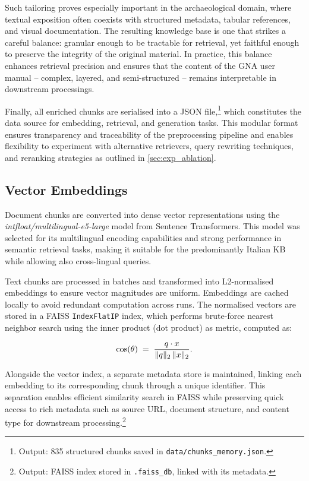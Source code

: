\begin{spacing}{1.5}
Such tailoring proves especially important in the archaeological domain, where textual exposition often coexists with structured metadata, tabular references, and visual documentation. The resulting knowledge base is one that strikes a careful balance: granular enough to be tractable for retrieval, yet faithful enough to preserve the integrity of the original material. In practice, this balance enhances retrieval precision and ensures that the content of the GNA user manual -- complex, layered, and semi-structured -- remains interpretable in downstream processings.

Finally, all enriched chunks are serialised into a JSON file,\footnote{Output: 835 structured chunks saved in \texttt{data/chunks\_memory.json}.} which constitutes the data source for embedding, retrieval, and generation tasks. This modular format ensures transparency and traceability of the preprocessing pipeline and enables flexibility to experiment with alternative retrievers, query rewriting techniques, and reranking strategies as outlined in \autoref{sec:exp_ablation}.

\sloppy
\subsection{Vector Embeddings}
Document chunks are converted into dense vector representations using the \textit{intfloat/multilingual-e5-large} model from Sentence Transformers. This model was selected for its multilingual encoding capabilities and strong performance in semantic retrieval tasks, making it suitable for the predominantly Italian KB while allowing also cross-lingual queries. 

Text chunks are processed in batches and transformed into L2-normalised embeddings to ensure vector magnitudes are uniform. Embeddings are cached locally to avoid redundant computation across runs. The normalised vectors are stored in a FAISS \texttt{IndexFlatIP} index, which performs brute-force nearest neighbor search using the inner product (dot product) as metric, computed as:

\[
\cos(\theta) \;=\; \frac{q \cdot x}{\|q\|_2 \, \|x\|_2}.\\
\]

Alongside the vector index, a separate metadata store is maintained, linking each embedding to its corresponding chunk through a unique identifier. This separation enables efficient similarity search in FAISS while preserving quick access to rich metadata such as source URL, document structure, and content type for downstream processing.\footnote{Output: FAISS index stored in \texttt{.faiss\_db}, linked with its metadata.}


\end{spacing}
